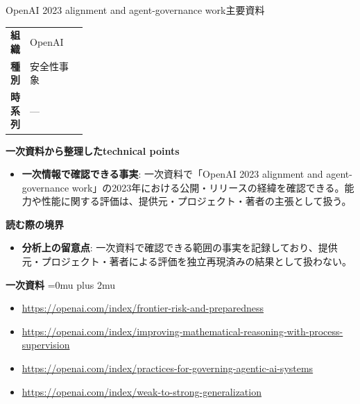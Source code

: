 \begin{technicalnote}{OpenAI 2023 alignment and agent-governance work}{主要資料}
\begingroup
\begin{tabularx}{\linewidth}{@{}>{\bfseries}p{0.22\linewidth}X@{}}
組織 & OpenAI \\
種別 & 安全性事象 \\
時系列 & — \\
\end{tabularx}
\smallskip
{\bfseries 一次資料から整理したtechnical points}
\begin{itemize}[leftmargin=1.5em,itemsep=0.35em]
\item \textbf{一次情報で確認できる事実}: 一次資料で「OpenAI 2023 alignment and agent-governance work」の2023年における公開・リリースの経緯を確認できる。能力や性能に関する評価は、提供元・プロジェクト・著者の主張として扱う。
\end{itemize}
\begin{minipage}{\linewidth}
{\bfseries 読む際の境界}
\begin{itemize}[leftmargin=1.5em,itemsep=0.35em]
\item \textbf{分析上の留意点}: 一次資料で確認できる範囲の事実を記録しており、提供元・プロジェクト・著者による評価を独立再現済みの結果として扱わない。
\end{itemize}
\begin{samepage}
{\bfseries 一次資料}
\begingroup\sloppy
\Urlmuskip=0mu plus 2mu\relax
\begin{itemize}[leftmargin=1.5em,itemsep=0.25em]
\item {\scriptsize\url{https://openai.com/index/frontier-risk-and-preparedness}}
\item {\scriptsize\url{https://openai.com/index/improving-mathematical-reasoning-with-process-supervision}}
\item {\scriptsize\url{https://openai.com/index/practices-for-governing-agentic-ai-systems}}
\item {\scriptsize\url{https://openai.com/index/weak-to-strong-generalization}}
\end{itemize}
\endgroup
\end{samepage}
\end{minipage}
\endgroup
\end{technicalnote}
\medskip

